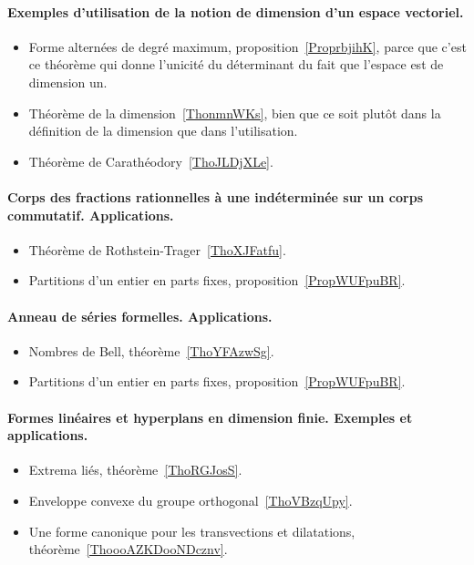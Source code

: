 \paragraph{Exemples d'utilisation de la notion de dimension d'un espace vectoriel.}
\begin{itemize}
    \item Forme alternées de degré maximum, proposition~\ref{ProprbjihK}, parce que c'est ce théorème qui donne l'unicité du déterminant du fait que l'espace est de dimension un.
    \item Théorème de la dimension~\ref{ThonmnWKs}, bien que ce soit plutôt dans la définition de la dimension que dans l'utilisation.
    \item Théorème de Carathéodory~\ref{ThoJLDjXLe}.
\end{itemize}

\paragraph{Corps des fractions rationnelles à une indéterminée sur un corps commutatif. Applications.}
\begin{itemize}
    \item Théorème de Rothstein-Trager~\ref{ThoXJFatfu}.
    \item Partitions d'un entier en parts fixes, proposition~\ref{PropWUFpuBR}.
\end{itemize}

\paragraph{Anneau de séries formelles. Applications.}
\begin{itemize}
    \item Nombres de Bell, théorème~\ref{ThoYFAzwSg}.
    \item Partitions d'un entier en parts fixes, proposition~\ref{PropWUFpuBR}.
\end{itemize}
\paragraph{Formes linéaires et hyperplans en dimension finie. Exemples et applications.}
\begin{itemize}
    \item Extrema liés, théorème~\ref{ThoRGJosS}.
    \item Enveloppe convexe du groupe orthogonal~\ref{ThoVBzqUpy}.
    \item Une forme canonique pour les transvections et dilatations, théorème~\ref{ThoooAZKDooNDcznv}.
\end{itemize}
